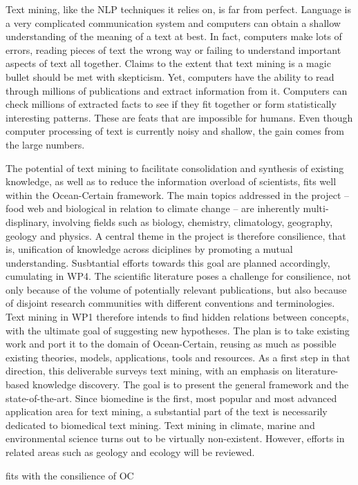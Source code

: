 Text mining, like the NLP techniques it relies on, is far from perfect.
Language is a very complicated communication system and computers can obtain a shallow understanding of the meaning of a text at best.
In fact, computers make lots of errors, reading pieces of text the wrong way or failing to understand important aspects of text all together.
Claims to the extent that text mining is a magic bullet should be met with skepticism. 
Yet, computers have the ability to read through millions of publications and extract information from it.
Computers can check millions of extracted facts to see if they fit together or form statistically interesting patterns.
These are feats that are impossible for humans.
Even though computer processing of text is currently noisy and shallow, the gain comes from the large numbers.

The potential of text mining to facilitate consolidation and synthesis of existing knowledge, as well as to reduce the information overload of scientists, fits well within the Ocean-Certain framework.
The main topics addressed in the project -- food web and biological in relation to climate change -- are inherently multi-displinary, involving fields such as biology, chemistry, climatology, geography, geology and physics.
A central theme in the project is therefore consilience, that is, unification of knowledge across diciplines by promoting a mutual understanding.
Susbtantial efforts towards this goal are planned accordingly, cumulating in WP4.
The scientific literature poses a challenge for consilience, not only because of the volume of potentially relevant publications, but also because of disjoint research communities with different conventions and terminologies.
Text mining in WP1 therefore intends to find hidden relations between concepts, with the ultimate goal of suggesting new hypotheses.
The plan is to take existing work and port it to the domain of Ocean-Certain, reusing as much as possible existing theories, models, applications, tools and resources.
As a first step in that direction, this deliverable surveys text mining, with an emphasis on literature-based knowledge discovery.
The goal is to present the general framework and the state-of-the-art.
Since biomedine is the first, most popular and most advanced application area for text mining, a substantial part of the text is necessarily dedicated to biomedical text mining.
Text mining in climate, marine and environmental science turns out to be virtually non-existent.
However, efforts in related areas such as geology and ecology will be reviewed.


  

 
  



    

   
   
fits with the consilience of OC



